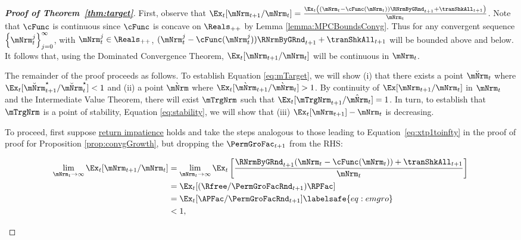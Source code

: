 \documentclass[\econtexRoot/BufferStockTheory]{subfiles}
\begin{document}
\begin{proof}[\textbf{Proof of Theorem~\ref{thm:target}}]

First, observe that $\Ex_{t}[{\mNrm}_{t+1}/\mNrm_t] = \frac{\Ex_{t}\left((\mNrm_t - \cFunc(\mNrm_t)) \RNrmByGRnd_{t+1} + \tranShkAll_{t+1}\right)}{\mNrm_t}$.
Note that $\cFunc$ is continuous since $\cFunc$ is concave on $\Reals_{++}$ by Lemma \ref{lemma:MPCBoundsConvg}.
Thus for any convergent sequence $\left\{\mNrm_t^{j}\right\}_{j=0}^{\infty}$, with $\mNrm_t^{j}\in \Reals_{++}$, $(\mNrm_t^{j} - \cFunc(\mNrm_t^{j})) \RNrmByGRnd_{t+1} + \tranShkAll_{t+1}$ will be bounded above and below.
It follows that, using the Dominated Convergence Theorem, $\Ex_{t}[{\mNrm}_{t+1}/\mNrm_t]$ will be continuous in $\mNrm_t$.



The remainder of the proof proceeds as follows.
To establish Equation \eqref{eq:mTarget}, we will show (i) that there exists a point $\breve{\mNrm}_{t}$ where $\Ex_t [\breve{\mNrm}_{t+1}^{\star}/\breve{\mNrm}_{t}^{\star}] < 1$ and (ii) a point $\grave{\mNrm}$ where $\Ex_t [\grave{\mNrm}_{t+1}/\grave{\mNrm}_{t}] > 1$.
By continuity of $\Ex[{\mNrm}_{t+1}/\mNrm_t]$ in $\mNrm_t$ and the Intermediate Value Theorem, there will exist $\mTrgNrm$ such that  $\Ex_t [{\mTrgNrm}_{t+1}/\hat{\mNrm}_{t}] = 1$.
In turn, to establish that $\mTrgNrm$ is a point of stability, Equation \eqref{eq:stability}, we will show that (iii) $\Ex_t [{\mNrm}_{t+1}]-\mNrm_{t}$ is decreasing.



To proceed, first suppose \hyperlink{RIC}{return impatience} holds and take the steps analogous to those leading to Equation~\eqref{eq:xtp1toinfty} in the proof of proof for Proposition \ref{prop:convgGrowth},  but dropping the $\PermGroFac_{t+1}$ from the RHS:
\begin{samepage}
\begin{align}
  \lim_{\mNrm_{t} \rightarrow \infty} \Ex_{t}[{\mNrm}_{t+1}/\mNrm_{t}]  & =   
                                                                       \lim_{\mNrm_{t} \rightarrow \infty} 
                                                                       \Ex_{t}\left[\frac{\RNrmByGRnd_{t+1}(\mNrm_{t}-\cFunc(\mNrm_{t}))+{\tranShkAll}_{t+1}}{\mNrm_{t}}\right] \notag 
  \\  & = \Ex_{t}[(\Rfree/{\PermGroFacRnd}_{t+1})\RPFac]  \notag
  \\  & = \Ex_{t}[{\APFac}/{\PermGroFacRnd}_{t+1}]  \labelsafe{eq:emgro}
  \\  & < 1, \notag
\end{align}
\end{samepage}


\end{proof}
\end{document}
